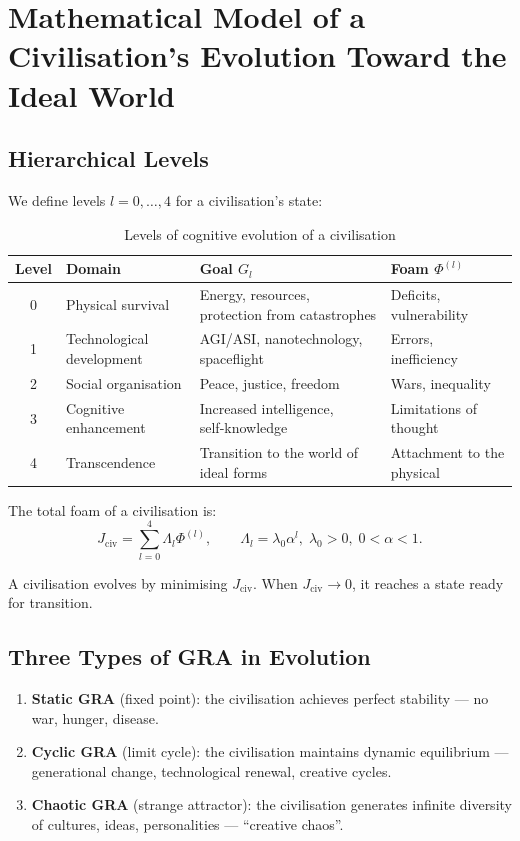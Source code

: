 \documentclass[12pt,a4paper]{article}
\begin{document}
\section{Mathematical Model of a Civilisation’s Evolution Toward the Ideal World}

\subsection{Hierarchical Levels}

We define levels \(l = 0,\dots,4\) for a civilisation’s state:

\begin{table}[h]
\centering
\caption{Levels of cognitive evolution of a civilisation}
\label{tab:levels}
\begin{tabular}{|c|l|l|p{6cm}|}
\hline
Level & Domain & Goal \(G_l\) & Foam \(\Phi^{(l)}\) \\
\hline
0 & Physical survival & Energy, resources, protection from catastrophes & Deficits, vulnerability \\
1 & Technological development & AGI/ASI, nanotechnology, spaceflight & Errors, inefficiency \\
2 & Social organisation & Peace, justice, freedom & Wars, inequality \\
3 & Cognitive enhancement & Increased intelligence, self‑knowledge & Limitations of thought \\
4 & Transcendence & Transition to the world of ideal forms & Attachment to the physical \\
\hline
\end{tabular}
\end{table}

The total foam of a civilisation is:
\[
J_{\text{civ}} = \sum_{l=0}^{4} \Lambda_l \Phi^{(l)}, \qquad \Lambda_l = \lambda_0 \alpha^l,\; \lambda_0>0,\;0<\alpha<1.
\]

A civilisation evolves by minimising \(J_{\text{civ}}\). When \(J_{\text{civ}} \to 0\), it reaches a state ready for transition.

\subsection{Three Types of GRA in Evolution}

\begin{enumerate}
    \item \textbf{Static GRA} (fixed point): the civilisation achieves perfect stability — no war, hunger, disease.
    \item \textbf{Cyclic GRA} (limit cycle): the civilisation maintains dynamic equilibrium — generational change, technological renewal, creative cycles.
    \item \textbf{Chaotic GRA} (strange attractor): the civilisation generates infinite diversity of cultures, ideas, personalities — “creative chaos”.
\end{enumerate}
\end{document}

